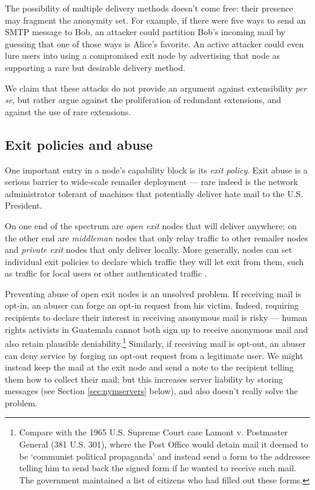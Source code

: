 \documentclass{llncs}
\begin{document}
The possibility of multiple delivery methods doesn't come free: their
presence may fragment the anonymity set.  For example, if there were five
ways to send an SMTP message to Bob, an attacker could partition Bob's
incoming mail by guessing that one of those ways is Alice's favorite.
An active attacker could even lure users into using a compromised
exit node by advertising that node as supporting a
rare but desirable delivery method.

We claim that these attacks do not provide an argument against
extensibility \emph{per se}, but rather argue against the proliferation
of redundant extensions, and against the use of rare extensions.  

\subsection{Exit policies and abuse}
\label{subsec:exitpolicies}

One important entry in a node's capability block is its \emph{exit
policy}. Exit abuse is a serious barrier to wide-scale remailer deployment
--- rare indeed is the network administrator tolerant of machines that
potentially deliver hate mail to the U.S. President.

On one end of the spectrum are \emph{open exit} nodes that will
deliver anywhere; on the other end are \emph{middleman} nodes that
only relay traffic to other remailer nodes and \emph{private exit}
nodes that only deliver locally. More generally, nodes can set
individual exit policies to declare which traffic they will let exit
from them, such as traffic for local users or other authenticated
traffic \cite{onion-discex00}.

Preventing abuse of open exit nodes is an unsolved problem. If
receiving mail is opt-in, an abuser can forge an opt-in request from
his victim. Indeed, requiring recipients to declare their interest
in receiving anonymous mail is risky --- human rights activists in
Guatemala cannot both sign up to receive anonymous mail and also retain
plausible deniability.\footnote{
  Compare with the 1965 U.S. Supreme Court case Lamont v. Postmaster
  General (381 U.S. 301), where the Post Office would detain mail it
  deemed to be `communist political propaganda' and instead send a form
  to the addressee telling him to send back the signed form if he wanted
  to receive such mail. The government maintained a list of citizens
  who had filled out these forms.
} Similarly, if receiving mail is opt-out, an abuser can deny service
by forging an opt-out request from a legitimate user. We might instead
keep the mail at the exit node and send a note to the recipient
telling them how to collect their mail; but this increases
server liability by storing messages (see Section \ref{sec:nymservers}
below), and also doesn't really solve the problem.
\end{document}
